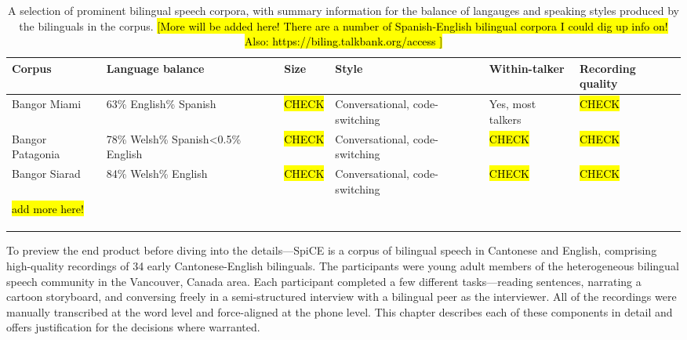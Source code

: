 \begin{table}[!htbp]
  \begin{center}\footnotesize\raggedright
  \begin{tabular}{L{0.9in}L{0.75in}L{0.45in}L{0.8in}L{0.5in}L{0.5in}} %
    \toprule
    \textbf{Corpus} &  \textbf{Language balance} & \textbf{Size} & \textbf{Style} & \textbf{Within-talker} & \textbf{Recording quality}\\
    \midrule
    Bangor Miami \citep{deuchar_2014_corpora} & 63\% English\% Spanish & \hl{CHECK} & Conversational, code-switching & Yes, most talkers & \hl{CHECK} \\
    \midrule
    Bangor Patagonia \citep{deuchar_2014_corpora} & 78\%	Welsh\% Spanish\newline <0.5\% English & \hl{CHECK} & Conversational, code-switching & \hl{CHECK} & \hl{CHECK} \\
    \midrule
    Bangor Siarad \citep{deuchar_2014_corpora} & 84\% Welsh\% English & \hl{CHECK} & Conversational, code-switching & \hl{CHECK} & \hl{CHECK} \\
    \midrule
    \hl{add more here!}  & & & & \\
    & & & & \\
    & & & & \\
    & & & & \\

    \bottomrule
  \end{tabular}
  \caption{A selection of prominent bilingual speech corpora, with summary information for the balance of langauges and speaking styles produced by the bilinguals in the corpus. \hl{[More will be added here! There are a number of Spanish-English bilingual corpora I could dig up info on! Also: https://biling.talkbank.org/access ]}}
  \label{ch2:tab:othercorpora}
  \end{center}
\end{table}

To preview the end product before diving into the details---SpiCE is a corpus of bilingual speech in Cantonese and English, comprising high-quality recordings of 34 early Cantonese-English bilinguals. The participants were young adult members of the heterogeneous bilingual speech community in the Vancouver, Canada area. Each participant completed a few different tasks—reading sentences, narrating a cartoon storyboard, and conversing freely in a semi-structured interview with a bilingual peer as the interviewer. All of the recordings were manually transcribed at the word level and force-aligned at the phone level. This chapter describes each of these components in detail and offers justification for the decisions where warranted.

